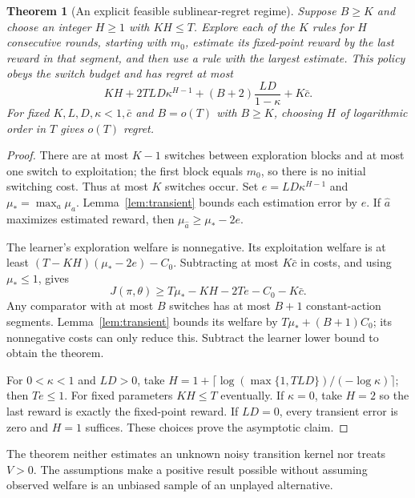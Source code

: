 \documentclass[11pt,a4paper]{article}
\newtheorem{theorem}{Theorem}[section]
\theoremstyle{remark}\newtheorem{remark}[theorem]{Remark}
\begin{document}
\begin{theorem}[An explicit feasible sublinear-regret regime]\label{thm:contract}
Suppose $B\ge K$ and choose an integer $H\ge1$ with $KH\le T$. Explore each of the $K$ rules for $H$ consecutive rounds, starting with $m_0$, estimate its fixed-point reward by the last reward in that segment, and then use a rule with the largest estimate. This policy obeys the switch budget and has regret at most
\[
KH+2TLD\kappa^{H-1}+(B+2)\frac{LD}{1-\kappa}+K\bar c.
\]
For fixed $K,L,D,\kappa<1,\bar c$ and $B=o(T)$ with $B\ge K$, choosing $H$ of logarithmic order in $T$ gives $o(T)$ regret.
\end{theorem}
\begin{proof}
There are at most $K-1$ switches between exploration blocks and at most one switch to exploitation; the first block equals $m_0$, so there is no initial switching cost. Thus at most $K$ switches occur. Set $e=LD\kappa^{H-1}$ and $\mu_* =\max_a\mu_a$. Lemma~\ref{lem:transient} bounds each estimation error by $e$. If $\widehat a$ maximizes estimated reward, then $\mu_{\widehat a}\ge\mu_*-2e$.

The learner's exploration welfare is nonnegative. Its exploitation welfare is at least $(T-KH)(\mu_*-2e)-C_0$. Subtracting at most $K\bar c$ in costs, and using $\mu_*\le1$, gives
\[
J(\pi,\theta)\ge T\mu_*-KH-2Te-C_0-K\bar c.
\]
Any comparator with at most $B$ switches has at most $B+1$ constant-action segments. Lemma~\ref{lem:transient} bounds its welfare by $T\mu_*+(B+1)C_0$; its nonnegative costs can only reduce this. Subtract the learner lower bound to obtain the theorem.

For $0<\kappa<1$ and $LD>0$, take
$H=1+\lceil\log(\max\{1,TLD\})/(-\log\kappa)\rceil$; then $Te\le1$. For fixed parameters $KH\le T$ eventually. If $\kappa=0$, take $H=2$ so the last reward is exactly the fixed-point reward. If $LD=0$, every transient error is zero and $H=1$ suffices. These choices prove the asymptotic claim.
\end{proof}
The theorem neither estimates an unknown noisy transition kernel nor treats $V>0$. The assumptions make a positive result possible without assuming observed welfare is an unbiased sample of an unplayed alternative.
\end{document}
